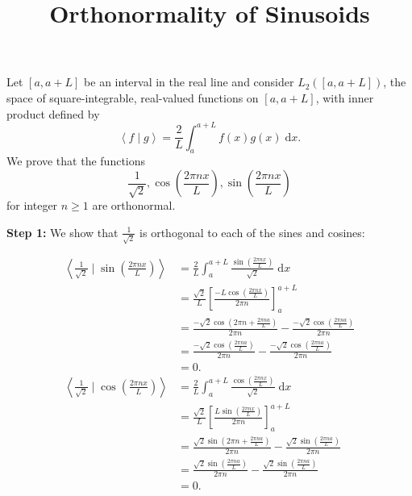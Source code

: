 \documentclass{article}
\newcommand{\diff}{\;\mathrm{d}}
\newcommand{\braket}[2]{\left\langle #1 \mid #2 \right\rangle}
\begin{document}
\title{Orthonormality of Sinusoids}
\date{}

\maketitle
\thispagestyle{empty}


\large



Let $[a,a+L]$ be an interval in the real line and consider $L_2([a,a+L])$, the space of square-integrable, real-valued functions on $[a,a+L]$, with inner product defined by
\[\braket{f}{g}=\frac{2}{L}\int_a^{a+L}\!\!\!f(x)g(x)\diff x.\]
We prove that the functions
\[\frac{1}{\sqrt{2}},\cos\left(\frac{2\pi nx}{L}\right),\sin\left(\frac{2\pi nx}{L}\right)\]
for integer $n\geq 1$ are orthonormal.\bigskip

\noindent\textbf{Step 1:} We show that $\frac{1}{\sqrt{2}}$ is orthogonal to each of the sines and cosines:\medskip

\begin{align*}
	\braket{\frac{1}{\sqrt{2}}}{\sin\left(\frac{2\pi nx}{L}\right)}&=\frac{2}{L}\int_a^{a+L}\!\! \frac{\sin\left(\frac{2\pi nx}{L}\right)}{\sqrt{2}}\diff x\\
	&= \frac{\sqrt{2}}{L}\left[ \frac{-L\cos\left(\frac{2\pi nx}{L}\right)}{2\pi n}\right]_a^{a+L}\\
	&= \frac{-\sqrt{2}\cos\left(2\pi n+\frac{2\pi na}{L}\right)}{2\pi n}-\frac{-\sqrt{2}\cos\left(\frac{2\pi na}{L}\right)}{2\pi n}\\
	&=\frac{-\sqrt{2}\cos\left(\frac{2\pi na}{L}\right)}{2\pi n}-\frac{-\sqrt{2}\cos\left(\frac{2\pi na}{L}\right)}{2\pi n}\\
	&=0.\\
	\braket{\frac{1}{\sqrt{2}}}{\cos\left(\frac{2\pi nx}{L}\right)}&=\frac{2}{L}\int_a^{a+L}\!\! \frac{\cos\left(\frac{2\pi nx}{L}\right)}{\sqrt{2}}\diff x\\
	&= \frac{\sqrt{2}}{L}\left[ \frac{L\sin\left(\frac{2\pi nx}{L}\right)}{2\pi n}\right]_a^{a+L}\\
	&= \frac{\sqrt{2}\sin\left(2\pi n+\frac{2\pi na}{L}\right)}{2\pi n}-\frac{\sqrt{2}\sin\left(\frac{2\pi na}{L}\right)}{2\pi n}\\
	&=\frac{\sqrt{2}\sin\left(\frac{2\pi na}{L}\right)}{2\pi n}-\frac{\sqrt{2}\sin\left(\frac{2\pi na}{L}\right)}{2\pi n}\\
	&=0.
\end{align*}

\bigskip
\end{document}
